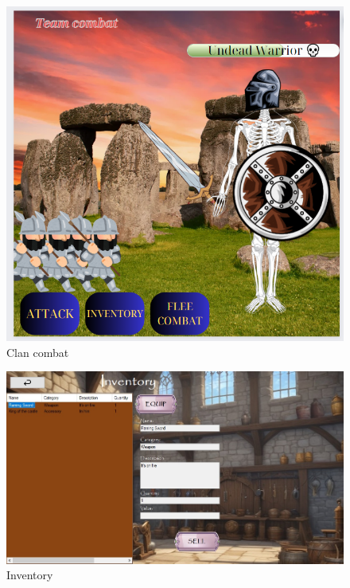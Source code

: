 \begin{figure}[!htb]
  \centering
    \centering
    \includegraphics[width=\textwidth]{mockup6.jpg}
    \caption{Clan combat}
    \label{}
\end{figure}
\begin{figure}[!htb]
  \centering
    \centering
    \includegraphics[width=\textwidth]{mockup7.jpg}
    \caption{Inventory}
    \label{}
\end{figure}
